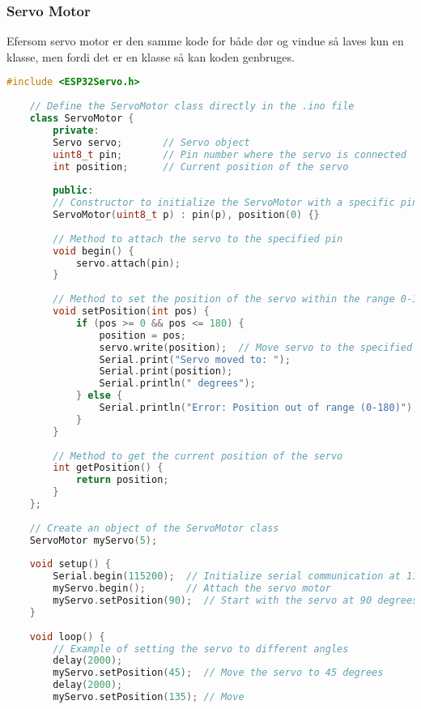 \subsubsection*{Servo Motor}
Efersom servo motor er den samme kode for både dør og vindue så laves kun en klasse, men fordi det er en klasse så kan koden genbruges.
\begin{lstlisting}[language=C++]
	#include <ESP32Servo.h>
	
	// Define the ServoMotor class directly in the .ino file
	class ServoMotor {
		private:
		Servo servo;       // Servo object
		uint8_t pin;       // Pin number where the servo is connected
		int position;      // Current position of the servo
		
		public:
		// Constructor to initialize the ServoMotor with a specific pin
		ServoMotor(uint8_t p) : pin(p), position(0) {}
		
		// Method to attach the servo to the specified pin
		void begin() {
			servo.attach(pin);
		}
		
		// Method to set the position of the servo within the range 0-180 degrees
		void setPosition(int pos) {
			if (pos >= 0 && pos <= 180) {
				position = pos;
				servo.write(position);  // Move servo to the specified position
				Serial.print("Servo moved to: ");
				Serial.print(position);
				Serial.println(" degrees");
			} else {
				Serial.println("Error: Position out of range (0-180)");
			}
		}
		
		// Method to get the current position of the servo
		int getPosition() {
			return position;
		}
	};
	
	// Create an object of the ServoMotor class
	ServoMotor myServo(5);
	
	void setup() {
		Serial.begin(115200);  // Initialize serial communication at 115200 baud rate
		myServo.begin();       // Attach the servo motor
		myServo.setPosition(90);  // Start with the servo at 90 degrees
	}
	
	void loop() {
		// Example of setting the servo to different angles
		delay(2000);
		myServo.setPosition(45);  // Move the servo to 45 degrees
		delay(2000);
		myServo.setPosition(135); // Move 
	\end{lstlisting}
	\clearpage
